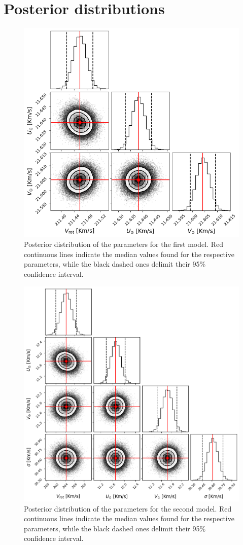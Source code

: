 \newpage
\appendix
\section{Posterior distributions}\label{Appendix:PosteriorDistributions}

\begin{figure}[H]
    \centering
    \includegraphics[width = 0.8\linewidth]{Fig/PosteriorSimple.png}
    \caption{Posterior distribution of the parameters for the first model. Red continuous lines indicate the median values found for the respective parameters, while the black dashed ones delimit their 95\% confidence interval.}\label{fig:PosteriorSimple}
\end{figure}

\begin{figure}[H]
    \centering
    \includegraphics[width = 0.8\linewidth]{Fig/PosteriorFull.png}
    \caption{Posterior distribution of the parameters for the second model. Red continuous lines indicate the median values found for the respective parameters, while the black dashed ones delimit their 95\% confidence interval.}\label{fig:PosteriorFull}
\end{figure}